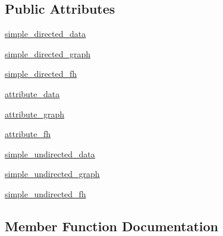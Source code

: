 \subsection*{Public Attributes}
\begin{DoxyCompactItemize}
\item 
\hyperlink{classnetworkx_1_1readwrite_1_1tests_1_1test__gexf_1_1TestGEXF_abca8aa2652bc48aa6832883fde4eb383}{simple\+\_\+directed\+\_\+data}
\item 
\hyperlink{classnetworkx_1_1readwrite_1_1tests_1_1test__gexf_1_1TestGEXF_af358080d2e0f01b0fd714b56abf6cf1f}{simple\+\_\+directed\+\_\+graph}
\item 
\hyperlink{classnetworkx_1_1readwrite_1_1tests_1_1test__gexf_1_1TestGEXF_ac5efb16dbb3b4d042f16b35bfbdf0571}{simple\+\_\+directed\+\_\+fh}
\item 
\hyperlink{classnetworkx_1_1readwrite_1_1tests_1_1test__gexf_1_1TestGEXF_aafc172ce3cbda4160b6a50bb95249c21}{attribute\+\_\+data}
\item 
\hyperlink{classnetworkx_1_1readwrite_1_1tests_1_1test__gexf_1_1TestGEXF_a71b127a4a3d1cfe6402d8fcb74d909a1}{attribute\+\_\+graph}
\item 
\hyperlink{classnetworkx_1_1readwrite_1_1tests_1_1test__gexf_1_1TestGEXF_a446a180d943756bac4edfc52c9073694}{attribute\+\_\+fh}
\item 
\hyperlink{classnetworkx_1_1readwrite_1_1tests_1_1test__gexf_1_1TestGEXF_afe39d7f1c908e3c7c941f641fd7678b9}{simple\+\_\+undirected\+\_\+data}
\item 
\hyperlink{classnetworkx_1_1readwrite_1_1tests_1_1test__gexf_1_1TestGEXF_a7b195092b7f4ee69743a1017716ff522}{simple\+\_\+undirected\+\_\+graph}
\item 
\hyperlink{classnetworkx_1_1readwrite_1_1tests_1_1test__gexf_1_1TestGEXF_ac251452b599e9dcd0b5b6d04ce1762e3}{simple\+\_\+undirected\+\_\+fh}
\end{DoxyCompactItemize}


\subsection{Member Function Documentation}
\mbox{\label{classnetworkx_1_1readwrite_1_1tests_1_1test__gexf_1_1TestGEXF_a7f33917d15bce5d43429b174aa35d0dd}} 
